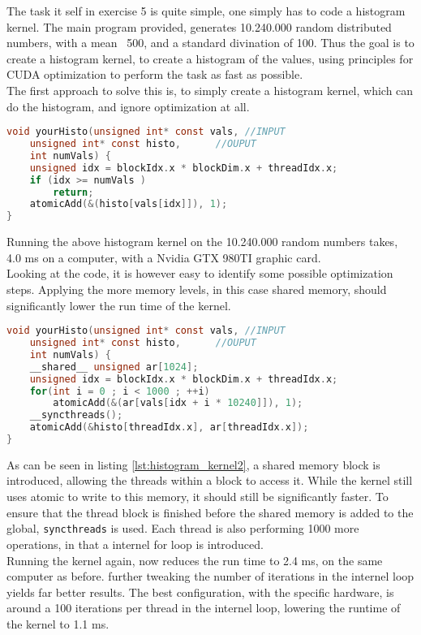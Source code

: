 The task it self in exercise 5 is quite simple, one simply has to code a histogram kernel. The main program provided, generates 10.240.000 random distributed numbers, with a mean ~500, and a standard divination of 100. Thus the goal is to create a histogram kernel, to create a histogram of the values, using principles for CUDA optimization to perform the task as fast as possible.\\

The first approach to solve this is, to simply create a histogram kernel, which can do the histogram, and ignore optimization at all.

\begin{lstlisting}[language=C,caption={Histogram kernel},label=lst:histogram_kernel]
void yourHisto(unsigned int* const vals, //INPUT
	unsigned int* const histo,      //OUPUT
	int numVals) {
	unsigned idx = blockIdx.x * blockDim.x + threadIdx.x;
	if (idx >= numVals )
		return;
	atomicAdd(&(histo[vals[idx]]), 1);
}
\end{lstlisting}

Running the above histogram kernel on the 10.240.000 random numbers takes, 4.0 ms on a computer, with a Nvidia GTX 980TI graphic card.\\ 
Looking at the code, it is however easy to identify some possible optimization steps. Applying the more memory levels, in this case shared memory, should significantly lower the run time of the kernel.\\
 
 \begin{lstlisting}[language=C,caption={Introducing shared memory into the histogram kernel},label=lst:histogram_kernel2]
void yourHisto(unsigned int* const vals, //INPUT
	unsigned int* const histo,      //OUPUT
	int numVals) {
	__shared__ unsigned ar[1024];
	unsigned idx = blockIdx.x * blockDim.x + threadIdx.x;
	for(int i = 0 ; i < 1000 ; ++i)
		atomicAdd(&(ar[vals[idx + i * 10240]]), 1);
	__syncthreads();
	atomicAdd(&histo[threadIdx.x], ar[threadIdx.x]);
}
 \end{lstlisting}
 
 As can be seen in listing \ref{lst:histogram_kernel2}, a shared memory block is introduced, allowing the threads within a block to access it. While the kernel still uses atomic to write to this memory, it should still be significantly faster. To ensure that the thread block is finished before the shared memory is added to the global, \texttt{syncthreads} is used. Each thread is also performing 1000 more operations, in that a internel for loop is introduced.\\
 Running the kernel again, now reduces the run time to 2.4 ms, on the same computer as before. further tweaking the number of iterations in the internel loop yields far better results. The best configuration, with the specific hardware, is around a 100 iterations per thread in the internel loop, lowering the runtime of the kernel to 1.1 ms.